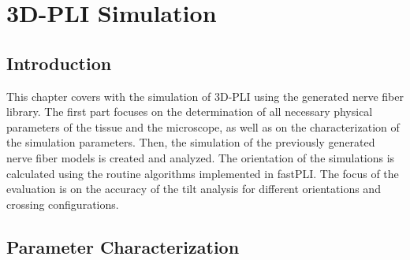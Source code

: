\cleardoublepage
\setcounter{chapter}{8}
\chapter{\acs{3D-PLI} Simulation}
\label{cha:simulation_analysis}
%
\section{Introduction}
%
This chapter covers with the simulation of \ac{3D-PLI} using the generated nerve fiber library.
The first part focuses on the determination of all necessary physical parameters of the tissue and the microscope, as well as on the characterization of the simulation parameters.
Then, the simulation of the previously generated nerve fiber models is created and analyzed.
The orientation of the simulations is calculated using the routine algorithms implemented in \ac{fastPLI}.
The focus of the evaluation is on the accuracy of the tilt analysis for different orientations and crossing configurations.
%
%
%
\section{Parameter Characterization}\label{sec:sim_choose_parameters}
%
